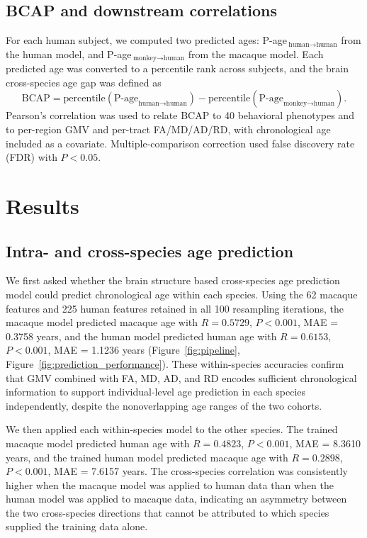 \documentclass[11pt]{article}
\begin{document}
\subsection{BCAP and downstream correlations}

For each human subject, we computed two predicted ages: P-age\,$_{\text{human}\to\text{human}}$ from the human model, and P-age\,$_{\text{monkey}\to\text{human}}$ from the macaque model. Each predicted age was converted to a percentile rank across subjects, and the brain cross-species age gap was defined as
\begin{equation}
\text{BCAP} = \text{percentile}(\text{P-age}_{\text{human}\to\text{human}}) - \text{percentile}(\text{P-age}_{\text{monkey}\to\text{human}}).
\end{equation}
Pearson's correlation was used to relate BCAP to 40 behavioral phenotypes and to per-region GMV and per-tract FA/MD/AD/RD, with chronological age included as a covariate. Multiple-comparison correction used false discovery rate (FDR) with $P < 0.05$.

\section{Results}

\subsection{Intra- and cross-species age prediction}

We first asked whether the brain structure based cross-species age prediction model could predict chronological age within each species. Using the 62 macaque features and 225 human features retained in all 100 resampling iterations, the macaque model predicted macaque age with $R = 0.5729$, $P < 0.001$, MAE = 0.3758 years, and the human model predicted human age with $R = 0.6153$, $P < 0.001$, MAE = 1.1236 years (Figure~\ref{fig:pipeline}, Figure~\ref{fig:prediction_performance}). These within-species accuracies confirm that GMV combined with FA, MD, AD, and RD encodes sufficient chronological information to support individual-level age prediction in each species independently, despite the nonoverlapping age ranges of the two cohorts.

We then applied each within-species model to the other species. The trained macaque model predicted human age with $R = 0.4823$, $P < 0.001$, MAE = 8.3610 years, and the trained human model predicted macaque age with $R = 0.2898$, $P < 0.001$, MAE = 7.6157 years. The cross-species correlation was consistently higher when the macaque model was applied to human data than when the human model was applied to macaque data, indicating an asymmetry between the two cross-species directions that cannot be attributed to which species supplied the training data alone.
\end{document}
